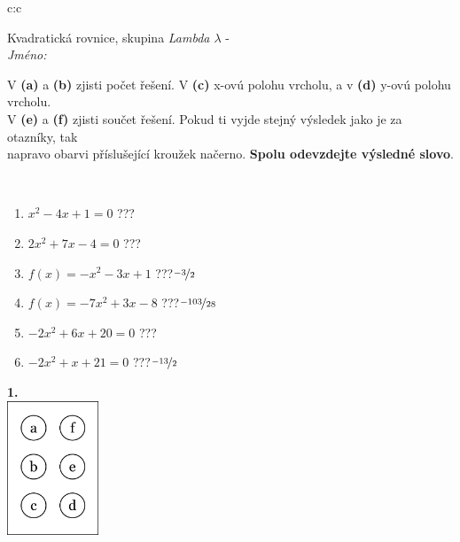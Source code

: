 \documentclass[10pt]{report}
\begin{document}
\begin{tabular}{c:c}
\begin{minipage}[c][104.5mm][t]{0.5\linewidth}
\begin{center}
\vspace{7mm}
{\huge Kvadratická rovnice, skupina \textit{Lambda $\lambda$} -}\\[5mm]
\textit{Jméno:}\phantom{xxxxxxxxxxxxxxxxxxxxxxxxxxxxxxxxxxxxxxxxxxxxxxxxxxxxxxxxxxxxxxxxx}\\[5mm]
\begin{minipage}{0.95\linewidth}
\begin{center}
V \textbf{(a)} a \textbf{(b)} zjisti počet řešení. V \textbf{(c)} x-ovú polohu vrcholu, a v \textbf{(d)} y-ovú polohu vrcholu.\\V \textbf{(e)} a \textbf{(f)} zjisti součet řešení. Pokud ti vyjde stejný výsledek jako je za otazníky, tak\\napravo obarvi příslušející kroužek načerno. \textbf{Spolu odevzdejte výsledné slovo}.
\end{center}
\end{minipage}
\\[1mm]
\begin{minipage}{0.79\linewidth}
\begin{center}
\begin{varwidth}{\linewidth}
\begin{enumerate}
\Large
\item $x^2-4x+1=0$\quad \dotfill\; ???\;\dotfill {}
\item $2x^2+7x-4=0$\quad \dotfill\; ???\;\dotfill {}
\item $f(x)=-x^2-3x+1$\quad \dotfill\; ???\;\dotfill \quad $\nicefrac{-3}{2}$
\item $f(x)=-7x^2+3x-8$\quad \dotfill\; ???\;\dotfill \quad $\nicefrac{-103}{28}$
\item $-2x^2+6x+20=0$\quad \dotfill\; ???\;\dotfill {}
\item $-2x^2+x+21=0$\quad \dotfill\; ???\;\dotfill \quad $\nicefrac{-13}{2}$
\end{enumerate}
\end{varwidth}
\end{center}
\end{minipage}
\begin{minipage}{0.20\linewidth}
\begin{center}
{\Huge\bfseries 1.} \\[2mm]
\includegraphics[height=40mm]{../images/braille.png}

\end{center}
\end{minipage}
\end{center}
\end{minipage}
\end{tabular}
\end{document}
